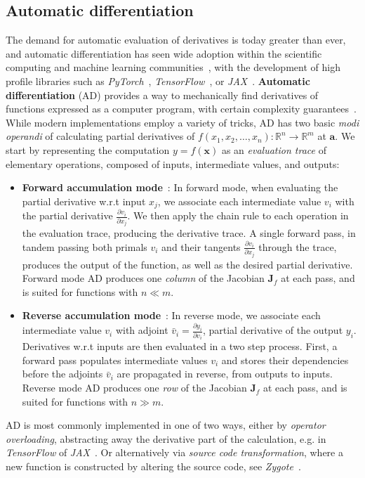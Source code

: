 \subsection{Automatic differentiation}
\label{subsec:autodiff}
The demand for automatic evaluation of derivatives is today greater than ever, and automatic differentiation has seen wide adoption within the scientific computing and machine learning communities~\cite{baydin2018automatic, lyu2013automatic, tamayo2018automatic}, with the development of high profile libraries such as \emph{PyTorch}~\cite{paszke2017automatic}, \emph{TensorFlow}~\cite{abadi2016tensorflow}, or \emph{JAX}~\cite{jax2018github}. \textbf{Automatic differentiation} (AD) provides a way to mechanically find derivatives of functions expressed as a computer program, with certain complexity guarantees~\cite{barak2016history}. While modern implementations employ a variety of tricks, AD has two basic \emph{modi operandi} of calculating partial derivatives of $f(x_1, x_2, \ldots, x_n): \mathbb{R}^n \rightarrow \mathbb{R}^m$ at $\mathbf{a}$. We start by representing the computation $y = f(\mathbf{x})$ as an \emph{evaluation trace} of elementary operations, composed of inputs, intermediate values, and outputs:
\begin{itemize}
	\item \textbf{Forward accumulation mode}~\cite{wengert1964simple}:  In forward mode, when evaluating the partial derivative w.r.t input $x_j$, we associate each intermediate value $v_i$ with the partial derivative $\frac{\partial v_i}{\partial x_j}$. We then apply the chain rule to each operation in the evaluation trace, producing the derivative trace. A single forward pass, in tandem passing both primals $v_i$ and their tangents $\frac{\partial v_i}{\partial x_j}$ through the trace, produces the output of the function, as well as the desired partial derivative. Forward mode AD produces one \emph{column} of the Jacobian $\textbf{J}_f$ at each pass, and is suited for functions with $n \ll m$.
	
	\item \textbf{Reverse accumulation mode}~\cite{speelpenning1980compiling}: In reverse mode, we associate each intermediate value $v_i$ with adjoint $\bar{v}_i = \frac{\partial y_i}{\partial v_i}$, partial derivative of the output $y_i$. Derivatives w.r.t inputs are then evaluated in a two step process. First, a forward pass populates intermediate values $v_i$ and stores their dependencies before the adjoints $\bar{v}_i$ are propagated in reverse, from outputs to inputs. Reverse mode AD produces one \emph{row} of the Jacobian $\textbf{J}_f$ at each pass, and is suited for functions with $n \gg m$.
\end{itemize}
AD is most commonly implemented in one of two ways, either by \emph{operator overloading}, abstracting away the derivative part of the calculation, e.g. in \emph{TensorFlow} of \emph{JAX}~\cite{abadi2016tensorflow, jax2018github}. Or alternatively via \emph{source code transformation}, where a new function is constructed by altering the source code, see \emph{Zygote}~\cite{innes2018don}.

